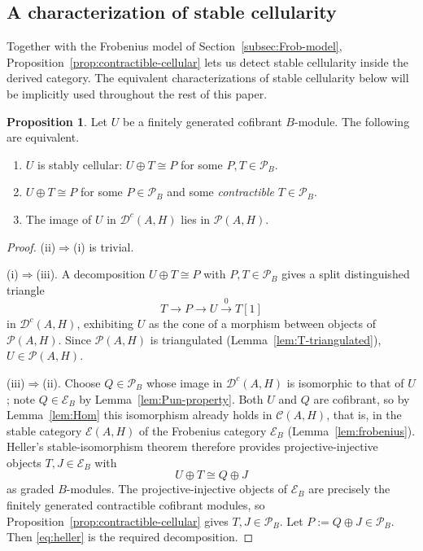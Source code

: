 \documentclass[11pt]{article}
\theoremstyle{definition}
\newtheorem{prop}[thm]{Proposition}
\numberwithin{equation}{section}
\newcommand{\Pun}{\mathcal{P}_B}
\newcommand{\E}{\mathcal E}
\newcommand{\Tcat}{\mathcal{P}(A,H)}
\newcommand{\Dc}{\mathcal{D}^c(A,H)}
\newcommand{\Cat}{\mathcal{C}}
\newcommand{\Ecat}{\mathcal{E}_B}
\begin{document}
\subsection{A characterization of stable cellularity}
Together with the Frobenius model of Section~\ref{subsec:Frob-model},
Proposition~\ref{prop:contractible-cellular} lets us detect stable cellularity
inside the derived category. The equivalent characterizations of stable cellularity below will be implicitly used throughout the rest of this paper. 

\begin{prop}\label{prop:stably-cellular-char}
Let $U$ be a finitely generated cofibrant $B$-module.  The following are
equivalent.
\begin{enumerate}
\item[(i)] $U$ is stably cellular: $U\oplus T\cong P$ for some $P,T\in\Pun$.
\item[(ii)] $U\oplus T\cong P$ for some $P\in\Pun$ and some \emph{contractible}
$T\in\Pun$.
\item[(iii)] The image of $U$ in $\Dc$ lies in $\Tcat$.
\end{enumerate}
\end{prop}

\begin{proof}
(ii)$\Rightarrow$(i) is trivial.

(i)$\Rightarrow$(iii).  A decomposition $U\oplus T\cong P$ with $P,T\in\Pun$
gives a split distinguished triangle
\[
T\longrightarrow P\longrightarrow U\xrightarrow{\ 0\ }T[1]
\]
in $\Dc$, exhibiting $U$ as the cone of a morphism between objects of $\Tcat$.
Since $\Tcat$ is triangulated (Lemma~\ref{lem:T-triangulated}), $U\in\Tcat$.

(iii)$\Rightarrow$(ii).  Choose $Q\in\Pun$ whose image in $\Dc$ is isomorphic
to that of $U$; note $Q\in\Ecat$ by Lemma~\ref{lem:Pun-property}.  Both $U$ and
$Q$ are cofibrant, so by Lemma~\ref{lem:Hom} this isomorphism already holds in
$\Cat(A,H)$, that is, in the stable category $\E (A,H)$ of the Frobenius
category $\Ecat$ (Lemma~\ref{lem:frobenius}).  Heller's stable-isomorphism
theorem \cite[Theorem 2.2]{Heller} therefore provides projective-injective objects $T,J\in\Ecat$ with
\begin{equation}\label{eq:heller}
U\oplus T\cong Q\oplus J
\end{equation}
as graded $B$-modules.  The projective-injective objects of $\Ecat$ are precisely
the finitely generated contractible cofibrant modules, so
Proposition~\ref{prop:contractible-cellular} gives $T,J\in\Pun$. Let $P:=Q\oplus J\in\Pun$. Then
\eqref{eq:heller} is the required decomposition.
\end{proof}
\end{document}
